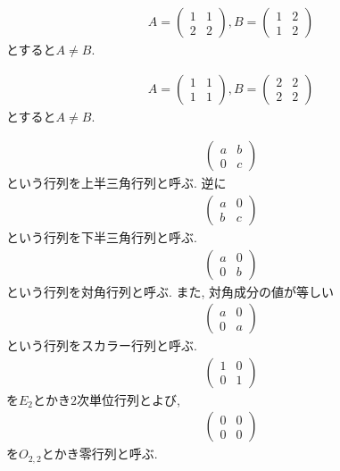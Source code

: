 \begin{example}
  \begin{align*}
    A=
    \begin{pmatrix}
      1&1\\
      2&2
    \end{pmatrix},
    B=
    \begin{pmatrix}
      1&2\\
      1&2
    \end{pmatrix}
  \end{align*}
  とすると$A\neq B$.
\end{example}

\begin{example}
  \begin{align*}
    A=
    \begin{pmatrix}
      1&1\\
      1&1
    \end{pmatrix},
    B=
    \begin{pmatrix}
      2&2\\
      2&2
    \end{pmatrix}
  \end{align*}
  とすると$A\neq B$.
\end{example}

\begin{align*}
  \begin{pmatrix}
    a&b\\
    0&c
  \end{pmatrix}
\end{align*}
という行列を上半三角行列と呼ぶ.
逆に
\begin{align*}
  \begin{pmatrix}
    a&0\\
    b&c
  \end{pmatrix}
\end{align*}
という行列を下半三角行列と呼ぶ.
\begin{align*}
  \begin{pmatrix}
    a&0\\
    0&b
  \end{pmatrix}
\end{align*}
という行列を対角行列と呼ぶ.
また, 対角成分の値が等しい
\begin{align*}
  \begin{pmatrix}
    a&0\\
    0&a
  \end{pmatrix}
\end{align*}
という行列をスカラー行列と呼ぶ.
\begin{align*}
  \begin{pmatrix}
    1&0\\
    0&1
  \end{pmatrix}
\end{align*}
を$E_2$とかき$2$次単位行列とよび,
\begin{align*}
  \begin{pmatrix}
    0&0\\
    0&0
  \end{pmatrix}
\end{align*}
を$O_{2,2}$とかき零行列と呼ぶ.


